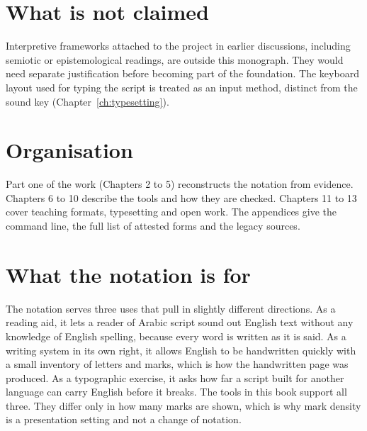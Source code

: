 \section{What is not claimed}
Interpretive frameworks attached to the project in earlier discussions, including semiotic or epistemological readings, are outside this monograph. They would need separate justification before becoming part of the foundation. The keyboard layout used for typing the script is treated as an input method, distinct from the sound key (Chapter~\ref{ch:typesetting}).

\section{Organisation}
Part one of the work (Chapters 2 to 5) reconstructs the notation from evidence. Chapters 6 to 10 describe the tools and how they are checked. Chapters 11 to 13 cover teaching formats, typesetting and open work. The appendices give the command line, the full list of attested forms and the legacy sources.

\section{What the notation is for}
The notation serves three uses that pull in slightly different directions. As a reading aid, it lets a reader of Arabic script sound out English text without any knowledge of English spelling, because every word is written as it is said. As a writing system in its own right, it allows English to be handwritten quickly with a small inventory of letters and marks, which is how the handwritten page was produced. As a typographic exercise, it asks how far a script built for another language can carry English before it breaks. The tools in this book support all three. They differ only in how many marks are shown, which is why mark density is a presentation setting and not a change of notation.

